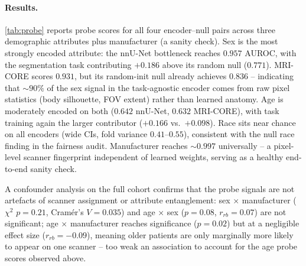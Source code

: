 \paragraph{Results.}
\autoref{tab:probe} reports probe scores for all four encoder--null pairs across
three demographic attributes plus manufacturer (a sanity check). Sex is the most
strongly encoded attribute: the nnU-Net bottleneck reaches $0.957$ AUROC, with the
segmentation task contributing $+0.186$ above its random null ($0.771$). MRI-CORE
scores $0.931$, but its random-init null already achieves $0.836$ -- indicating
that ${\sim}90\%$ of the sex signal in the task-agnostic encoder comes from raw
pixel statistics (body silhouette, FOV extent) rather than learned anatomy. Age
is moderately encoded on both ($0.642$ nnU-Net, $0.632$ MRI-CORE), with task
training again the larger contributor ($+0.166$ vs.\ $+0.098$).
Race sits near chance on all encoders (wide CIs, fold variance $0.41$--$0.55$), consistent
with the null race finding in the fairness audit. Manufacturer reaches ${\sim}0.997$
universally -- a pixel-level scanner fingerprint independent of learned weights,
serving as a healthy end-to-end sanity check.

A confounder analysis on the full cohort confirms that the probe signals are not
artefacts of scanner assignment or attribute entanglement: sex $\times$
manufacturer ($\chi^2$ $p = 0.21$, Cram\'er's $V = 0.035$) and age $\times$ sex
($p = 0.08$, $r_{rb} = 0.07$) are not significant; age $\times$ manufacturer
reaches significance ($p = 0.02$) but at a negligible effect size
($r_{rb} = -0.09$), meaning older patients are only marginally more likely to
appear on one scanner -- too weak an association to account for the age probe
scores observed above.

